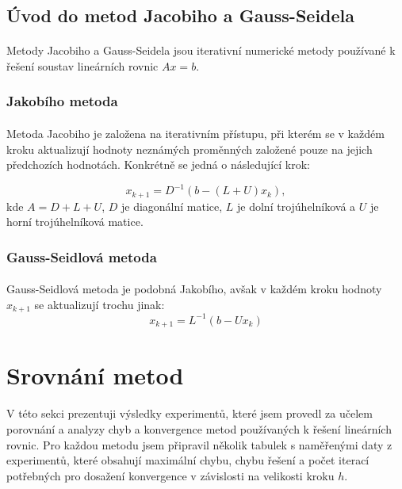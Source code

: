 \documentclass{article}
\begin{document}
\subsection*{Úvod do metod Jacobiho a Gauss-Seidela}

\paragraph*{} Metody Jacobiho a Gauss-Seidela jsou iterativní numerické metody používané 
k řešení soustav lineárních rovnic $Ax = b$.

\subsubsection*{Jakobího metoda}

\paragraph*{}Metoda Jacobiho je založena na iterativním přístupu, 
při kterém se v každém kroku aktualizují hodnoty neznámých proměnných založené pouze na 
jejich předchozích hodnotách. Konkrétně se jedná o následující krok:

\begin{equation*}
    x_{k+1} = D^{-1} \left(b - (L+U) x_k\right),
\end{equation*}
kde $A = D + L + U$, $D$ je diagonální matice, $L$ je dolní trojúhelníková a $U$ je horní trojúhelníková matice.

\subsubsection*{Gauss-Seidlová metoda}
\paragraph*{} Gauss-Seidlová metoda je podobná Jakobího, avšak v každém kroku hodnoty $x_{k+1}$ se aktualizují trochu jinak:
\begin{equation*}
    x_{k+1} = L^{-1}\left(b - Ux_k\right)
\end{equation*}

\section*{Srovnání metod}

\paragraph*{}V této sekci prezentuji výsledky experimentů, které jsem provedl za učelem porovnání a analyzy chyb a konvergence 
metod používaných k řešení lineárních rovnic. Pro každou metodu jsem připravil několik tabulek s 
naměřenými daty z experimentů, které obsahují maximální chybu, chybu řešení a počet iterací potřebných 
pro dosažení konvergence v závislosti na velikosti kroku $h$.
\end{document}
